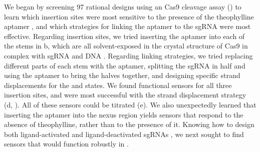 \documentclass[10pt,oneside]{article}
\begin{document}

We began by screening 97 rational designs using an \invitro{} Cas9 cleavage assay () to learn which insertion sites were most sensitive to the presence of the theophylline aptamer \autocite{jenison1994}, and which strategies for linking the aptamer to the sgRNA were most effective.  Regarding insertion sites, we tried inserting the aptamer into each of the stems in b, which are all solvent-exposed in the crystal structure of Cas9 in complex with sgRNA and DNA \autocite{nishimasu2014}.  Regarding linking strategies, we tried replacing different parts of each stem with the aptamer, splitting the sgRNA in half and using the aptamer to bring the halves together, and designing specific strand displacements for the \apo{} and \holo{} states.  We found functional sensors for all three insertion sites, and were most successful with the strand displacement strategy (d, ).  All of these sensors could be titrated (e).  We also unexpectedly learned that inserting the aptamer into the nexus region yields sensors that respond to the absence of theophylline, rather than to the presence of it.  Knowing how to design both ligand-activated and ligand-deactivated sgRNAs \invitro{}, we next sought to find sensors that would function robustly in \ecoli{}.
% 
% 
% 
% 
% 
% 

\end{document}
